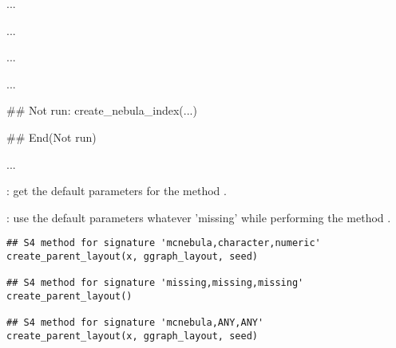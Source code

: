 \documentclass[letterpaper]{book}
\begin{document}
%
\begin{Arguments}
\begin{ldescription}
\item[\code{x}] ...

\item[\code{force}] ...
\end{ldescription}
\end{Arguments}
%
\begin{Details}\relax
...
\end{Details}
%
\begin{Value}
...
\end{Value}
%
\begin{SeeAlso}\relax
{}
\end{SeeAlso}
%
\begin{Examples}
\begin{ExampleCode}
## Not run: 
create_nebula_index(...)

## End(Not run)
\end{ExampleCode}
\end{Examples}
%
\begin{Description}\relax
...

: get the default parameters for the method
.

: use the default parameters whatever 'missing'
while performing the method .
\end{Description}
%
\begin{Usage}
\begin{verbatim}
## S4 method for signature 'mcnebula,character,numeric'
create_parent_layout(x, ggraph_layout, seed)

## S4 method for signature 'missing,missing,missing'
create_parent_layout()

## S4 method for signature 'mcnebula,ANY,ANY'
create_parent_layout(x, ggraph_layout, seed)
\end{verbatim}
\end{Usage}
\end{document}
